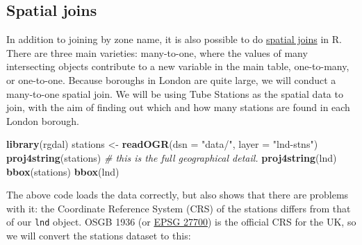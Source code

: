\documentclass[]{article}
\newenvironment{Shaded}{}{}
\newcommand{\KeywordTok}[1]{\textcolor[rgb]{0.00,0.44,0.13}{\textbf{{#1}}}}
\newcommand{\DataTypeTok}[1]{\textcolor[rgb]{0.56,0.13,0.00}{{#1}}}
\newcommand{\StringTok}[1]{\textcolor[rgb]{0.25,0.44,0.63}{{#1}}}
\newcommand{\CommentTok}[1]{\textcolor[rgb]{0.38,0.63,0.69}{\textit{{#1}}}}
\newcommand{\NormalTok}[1]{{#1}}
\begin{document}
\subsection{Spatial joins}

In addition to joining by zone name, it is also possible to do
\href{http://help.arcgis.com/en/arcgisdesktop/10.0/help/index.html\#//00080000000q000000}{spatial
joins} in R. There are three main varieties: many-to-one, where the
values of many intersecting objects contribute to a new variable in the
main table, one-to-many, or one-to-one. Because boroughs in London are
quite large, we will conduct a many-to-one spatial join. We will be
using Tube Stations as the spatial data to join, with the aim of finding
out which and how many stations are found in each London borough.

\begin{Shaded}
\begin{Highlighting}[]
\KeywordTok{library}\NormalTok{(rgdal)}
\NormalTok{stations <- }\KeywordTok{readOGR}\NormalTok{(}\DataTypeTok{dsn =} \StringTok{"data/"}\NormalTok{, }\DataTypeTok{layer =} \StringTok{"lnd-stns"}\NormalTok{)}
\KeywordTok{proj4string}\NormalTok{(stations)  }\CommentTok{# this is the full geographical detail.}
\KeywordTok{proj4string}\NormalTok{(lnd)}
\KeywordTok{bbox}\NormalTok{(stations)}
\KeywordTok{bbox}\NormalTok{(lnd)}
\end{Highlighting}
\end{Shaded}
The above code loads the data correctly, but also shows that there are
problems with it: the Coordinate Reference System (CRS) of the stations
differs from that of our \texttt{lnd} object. OSGB 1936 (or
\href{http://spatialreference.org/ref/epsg/27700/}{EPSG 27700}) is the
official CRS for the UK, so we will convert the stations dataset to
this:
\end{document}
